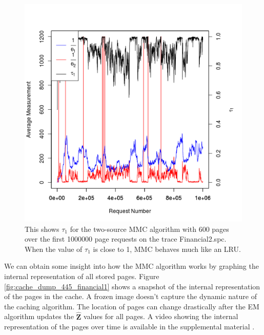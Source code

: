   \begin{figure}
  \centering
  \includegraphics[width=6in]{../media/tau_and_theta_600_600_2400_3.png}
  \caption[$\tau_1$, $\frac{1}{\theta_1}$, and $\frac{1}{\theta_2}$ for 600
  page MMC cache on trace Financial2.spc]{This shows $\tau_1$ for the two-source MMC
  algorithm with 600 pages over the first 1000000 page requests on the trace
  Financial2.spc. When the value of $\tau_1$ is close to 1, MMC behaves much
  like an LRU.}
  \label{fig:tau_and_theta_600_financial2}
  \end{figure}

  We can obtain some insight into how the MMC algorithm works by graphing the
  internal representation of all stored pages. Figure
  \ref{fig:cache_dump_445_financial1} shows a snapshot of the internal
  representation of the pages in the cache. A frozen image doesn't capture the
  dynamic nature of the caching algorithm. The location of pages can change
  drastically after the EM algorithm updates the $\hat{\bm{Z}}$ values for all
  pages. A video showing the internal representation of the pages over time is
  available in the supplemental material \cite{supplimental}.

